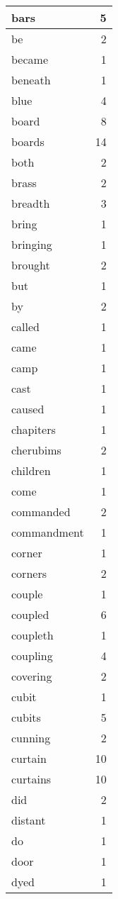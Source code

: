 \begin{center}
\begin{longtable}{l|r}
bars & 5 \\ \hline
be & 2 \\ \hline
became & 1 \\ \hline
beneath & 1 \\ \hline
blue & 4 \\ \hline
board & 8 \\ \hline
boards & 14 \\ \hline
both & 2 \\ \hline
brass & 2 \\ \hline
breadth & 3 \\ \hline
bring & 1 \\ \hline
bringing & 1 \\ \hline
brought & 2 \\ \hline
but & 1 \\ \hline
by & 2 \\ \hline
called & 1 \\ \hline
came & 1 \\ \hline
camp & 1 \\ \hline
cast & 1 \\ \hline
caused & 1 \\ \hline
chapiters & 1 \\ \hline
cherubims & 2 \\ \hline
children & 1 \\ \hline
come & 1 \\ \hline
commanded & 2 \\ \hline
commandment & 1 \\ \hline
corner & 1 \\ \hline
corners & 2 \\ \hline
couple & 1 \\ \hline
coupled & 6 \\ \hline
coupleth & 1 \\ \hline
coupling & 4 \\ \hline
covering & 2 \\ \hline
cubit & 1 \\ \hline
cubits & 5 \\ \hline
cunning & 2 \\ \hline
curtain & 10 \\ \hline
curtains & 10 \\ \hline
did & 2 \\ \hline
distant & 1 \\ \hline
do & 1 \\ \hline
door & 1 \\ \hline
dyed & 1 \\ \hline

\end{longtable}
\end{center}
